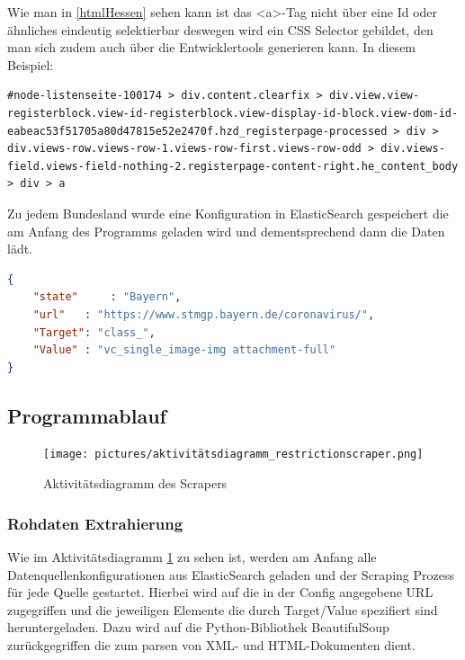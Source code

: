\documentclass[12pt,oneside,a4paper,parskip]{scrbook}
\begin{document}
Wie man in \cref{htmlHessen} sehen kann ist das \textless a\textgreater -Tag nicht über eine Id oder ähnliches eindeutig selektierbar deswegen wird ein CSS Selector gebildet, den man sich zudem auch über die Entwicklertools generieren kann. In diesem Beispiel:
\begin{lstlisting}[caption=CSS Selector]
#node-listenseite-100174 > div.content.clearfix > div.view.view-registerblock.view-id-registerblock.view-display-id-block.view-dom-id-eabeac53f51705a80d47815e52e2470f.hzd_registerpage-processed > div > div.views-row.views-row-1.views-row-first.views-row-odd > div.views-field.views-field-nothing-2.registerpage-content-right.he_content_body > div > a
\end{lstlisting}

Zu jedem Bundesland wurde eine Konfiguration in ElasticSearch gespeichert die am Anfang des Programms geladen wird und dementsprechend dann die Daten lädt.

\begin{lstlisting}[caption=Config von Bayern, language=json]
{
	"state" 	: "Bayern",
	"url"	: "https://www.stmgp.bayern.de/coronavirus/",
	"Target": "class_",
	"Value"	: "vc_single_image-img attachment-full"
}
\end{lstlisting}

\subsection{Programmablauf}

\begin{figure}[H]
\caption{Aktivitätsdiagramm des Scrapers}
\label{activityRestriction}
\centering
\texttt{[image: pictures/aktivitätsdiagramm\_restrictionscraper.png]}
\end{figure}

\subsubsection{Rohdaten Extrahierung}\label{sec:sub:sub:rohdaten}

Wie im Aktivitätsdiagramm \cref{activityRestriction} zu sehen ist, werden am Anfang alle Datenquellenkonfigurationen aus ElasticSearch geladen und der Scraping Prozess für jede Quelle gestartet. Hierbei wird auf die in der Config angegebene URL zugegriffen und die jeweiligen Elemente die durch Target/Value spezifiert sind heruntergeladen. Dazu wird auf die Python-Bibliothek BeautifulSoup zurückgegriffen die zum parsen von XML- und HTML-Dokumenten dient.
\end{document}
